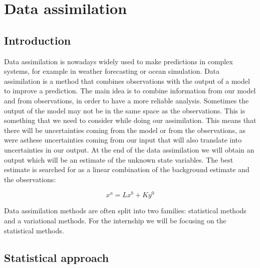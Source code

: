 \section{Data assimilation}

\subsection{Introduction}
\noindent Data assimilation is nowadays widely used to make predictions in complex systems, for example in weather forecasting or ocean simulation. Data assimilation is a method that combines observations with the output of a model to improve a prediction. 
The main idea is to combine information from our model and from observations, in order to have a more reliable analysis. Sometimes the output of the model may not be in the same space as the observations. This is something that we need to consider while doing our assimilation. This means that there will be uncertainties coming from the model or from the observations, as were asthese uncertainties coming from our input that will also translate into uncertainties in our output.
At the end of the data assimilation we will obtain an output which will be an estimate of the unknown  state variables.
The best estimate is searched for as a linear combination of the background estimate and the observations:

$$x^a=Lx^b+Ky^0$$


\noindent Data assimilation methods are often split into two families: statistical methods and a variational methods.
For the internship we will be focusing on the statistical methods.
\subsection{Statistical approach}
